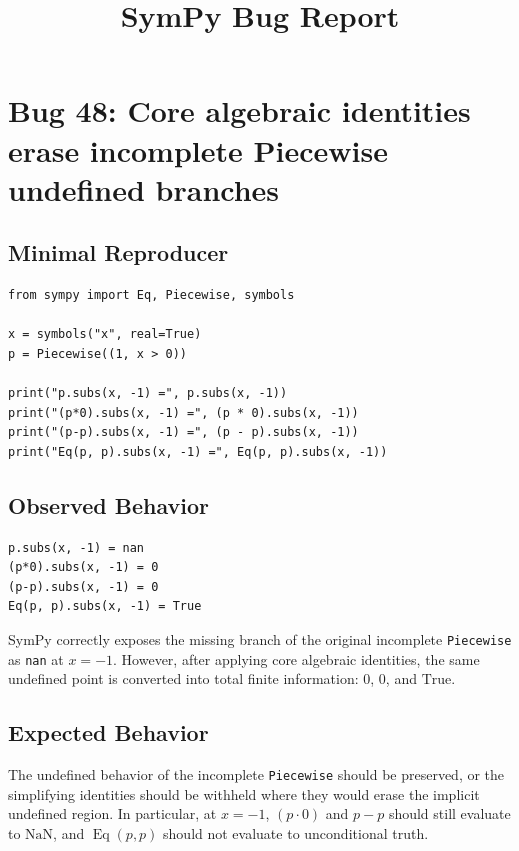 \documentclass[11pt]{article}
\title{SymPy Bug Report}
\author{}
\date{}
\begin{document}
\maketitle

\section{Bug 48: Core algebraic identities erase incomplete Piecewise undefined branches}

\subsection{Minimal Reproducer}

\medskip

\begin{lstlisting}[style=bugpython]
from sympy import Eq, Piecewise, symbols

x = symbols("x", real=True)
p = Piecewise((1, x > 0))

print("p.subs(x, -1) =", p.subs(x, -1))
print("(p*0).subs(x, -1) =", (p * 0).subs(x, -1))
print("(p-p).subs(x, -1) =", (p - p).subs(x, -1))
print("Eq(p, p).subs(x, -1) =", Eq(p, p).subs(x, -1))
\end{lstlisting}

\subsection{Observed Behavior}

\medskip

\begin{lstlisting}[style=bugpython]
p.subs(x, -1) = nan
(p*0).subs(x, -1) = 0
(p-p).subs(x, -1) = 0
Eq(p, p).subs(x, -1) = True
\end{lstlisting}

SymPy correctly exposes the missing branch of the original incomplete
\texttt{Piecewise} as \texttt{nan} at \(x=-1\).  However, after applying core
algebraic identities, the same undefined point is converted into total finite
information: \(0\), \(0\), and \(\mathrm{True}\).

\subsection{Expected Behavior}

The undefined behavior of the incomplete \texttt{Piecewise} should be preserved,
or the simplifying identities should be withheld where they would erase the
implicit undefined region.  In particular, at \(x=-1\),
\((p\cdot 0)\) and \(p-p\) should still evaluate to \(\mathrm{NaN}\), and
\(\operatorname{Eq}(p,p)\) should not evaluate to unconditional truth.
\end{document}
